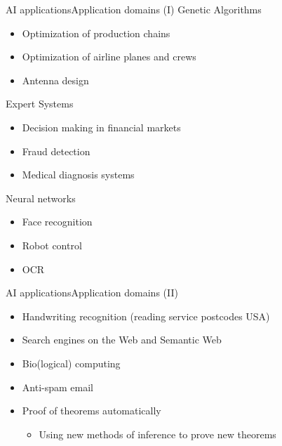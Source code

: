 \documentclass[10pt,compress]{beamer} %
\begin{document}
\begin{frame}{AI applications}{Application domains (I)}
	Genetic Algorithms
	\begin{itemize}
		\item Optimization of production chains
		\item Optimization of airline planes and crews
		\item Antenna design
	\end{itemize}
	Expert Systems
	\begin{itemize}
		\item Decision making in financial markets
		\item Fraud detection
		\item Medical diagnosis systems
	\end{itemize}
	Neural networks
	\begin{itemize}
		\item Face recognition
		\item Robot control
		\item OCR
	\end{itemize}
\end{frame}

\begin{frame}{AI applications}{Application domains (II)}
	\begin{itemize}
		\item Handwriting recognition (reading service postcodes USA) 
		\item Search engines on the Web and Semantic Web 
		\item Bio(logical) computing 
		\item Anti-spam email 
		\item Proof of theorems automatically 
			\begin{itemize}
			\item Using new methods of inference to prove new theorems
			\end{itemize}
	\end{itemize}
\end{frame}

\end{document}
